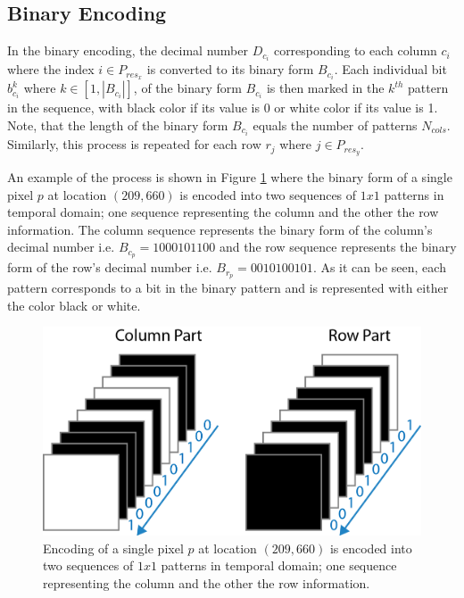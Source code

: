 \documentclass[final,12pt,3p]{elsarticle}
\begin{document}
\subsection{Binary Encoding}
In the binary encoding, the decimal number $D_{c_{i}}$ corresponding to each column $c_{i}$ where the index $i \in P_{res_{x}}$ is converted to its binary form $B_{c_{i}}$. Each individual bit $b_{c_{i}}^{k}$ where $k \in [1, |B_{c_{i}}|]$, of the binary form $B_{c_{i}}$ is then marked in the $k^{th}$ pattern in the sequence, with black color if its value is 0 or white color if its value is 1. Note, that the length of the binary form $B_{c_{i}}$ equals the number of patterns $N_{cols}$. Similarly, this process is repeated for each row $r_{j}$ where $j \in P_{res_{y}}$. 

An example of the process is shown in Figure \ref{fig:pixel_encoding} where the binary form of a single pixel $p$ at location $(209,660)$ is encoded into two sequences of $1x1$ patterns in temporal domain; one sequence representing the column and the other the row information. The column sequence represents the binary form of the column's decimal number i.e. $B_{c_{p}} = 1000101100$ and the row sequence represents the binary form of the row's decimal number i.e. $B_{r_{p}} = 0010100101$. As it can be seen, each pattern corresponds to a bit in the binary pattern and is represented with either the color black or white.

\begin{figure}[!ht]
 \centering
 \includegraphics[scale=0.8]{./pixelSeq.png}
 \caption{\label{fig:pixel_encoding} Encoding of a single pixel $p$ at location $(209,660)$ is encoded into two sequences of $1x1$ patterns in temporal domain; one sequence representing the column and the other the row information.}
\end{figure}
\end{document}
